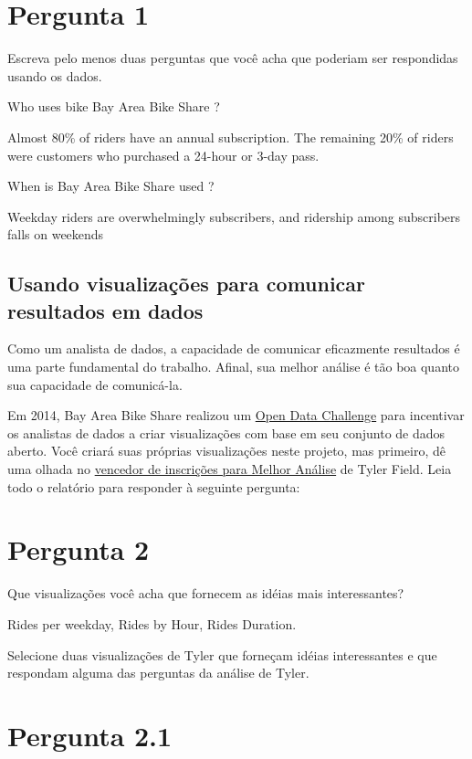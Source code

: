\documentclass[11pt]{article}
\begin{document}
    \section{Pergunta 1}\label{pergunta-1}

Escreva pelo menos duas perguntas que você acha que poderiam ser
respondidas usando os dados.

    Who uses bike Bay Area Bike Share ?

Almost 80\% of riders have an annual subscription. The remaining 20\% of
riders were customers who purchased a 24-hour or 3-day pass.

When is Bay Area Bike Share used ?

Weekday riders are overwhelmingly subscribers, and ridership among
subscribers falls on weekends

    \subsection{Usando visualizações para comunicar resultados em
dados}\label{usando-visualizauxe7uxf5es-para-comunicar-resultados-em-dados}

Como um analista de dados, a capacidade de comunicar eficazmente
resultados é uma parte fundamental do trabalho. Afinal, sua melhor
análise é tão boa quanto sua capacidade de comunicá-la.

Em 2014, Bay Area Bike Share realizou um
\href{http://www.bayareabikeshare.com/datachallenge-2014}{Open Data
Challenge} para incentivar os analistas de dados a criar visualizações
com base em seu conjunto de dados aberto. Você criará suas próprias
visualizações neste projeto, mas primeiro, dê uma olhada no
\href{http://thfield.github.io/babs/index.html}{vencedor de inscrições
para Melhor Análise} de Tyler Field. Leia todo o relatório para
responder à seguinte pergunta:

    \section{Pergunta 2}\label{pergunta-2}

Que visualizações você acha que fornecem as idéias mais interessantes?

Rides per weekday, Rides by Hour, Rides Duration.

Selecione duas visualizações de Tyler que forneçam idéias interessantes
e que respondam alguma das perguntas da análise de Tyler.

    \section{Pergunta 2.1}\label{pergunta-2.1}
\end{document}
